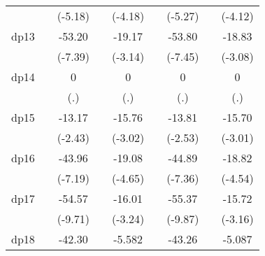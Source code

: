{\begin{tabular}{l*{8}{c}}
            &                     &     (-5.18)         &                     &     (-4.18)         &                     &     (-5.27)         &                     &     (-4.12)         \\
[1em]
dp13        &                     &      -53.20\sym{***}&                     &      -19.17\sym{**} &                     &      -53.80\sym{***}&                     &      -18.83\sym{**} \\
            &                     &     (-7.39)         &                     &     (-3.14)         &                     &     (-7.45)         &                     &     (-3.08)         \\
[1em]
dp14        &                     &           0         &                     &           0         &                     &           0         &                     &           0         \\
            &                     &         (.)         &                     &         (.)         &                     &         (.)         &                     &         (.)         \\
[1em]
dp15        &                     &      -13.17\sym{*}  &                     &      -15.76\sym{**} &                     &      -13.81\sym{*}  &                     &      -15.70\sym{**} \\
            &                     &     (-2.43)         &                     &     (-3.02)         &                     &     (-2.53)         &                     &     (-3.01)         \\
[1em]
dp16        &                     &      -43.96\sym{***}&                     &      -19.08\sym{***}&                     &      -44.89\sym{***}&                     &      -18.82\sym{***}\\
            &                     &     (-7.19)         &                     &     (-4.65)         &                     &     (-7.36)         &                     &     (-4.54)         \\
[1em]
dp17        &                     &      -54.57\sym{***}&                     &      -16.01\sym{**} &                     &      -55.37\sym{***}&                     &      -15.72\sym{**} \\
            &                     &     (-9.71)         &                     &     (-3.24)         &                     &     (-9.87)         &                     &     (-3.16)         \\
[1em]
dp18        &                     &      -42.30\sym{***}&                     &      -5.582         &                     &      -43.26\sym{***}&                     &      -5.087         \\

\end{tabular}}
